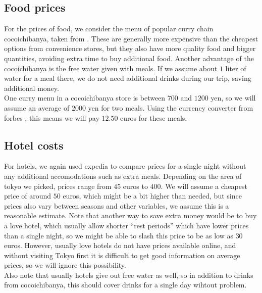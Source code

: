 \documentclass{article}
\begin{document}
\subsection{Food prices}
For the prices of food, we consider the menu of popular curry chain cocoichibanya, taken from \cite{coco}.
These are generally more expensive than the cheapest options from convenience stores, but they also have more quality food and bigger quantities, avoiding extra time to buy additional food.
Another advantage of the cocoichibanya is the free water given with meals. 
If we assume about $1$ liter of water for a meal there, we do not need additional drinks during our trip, saving additional money.\\
One curry menu in a cocoichibanya store is between $700$ and $1200$ yen, so we will assume an average of $2000$ yen for two meals.
Using the currency converter from forbes \cite{yen}, this means we will pay $12.50$ euros for these meals. 

\subsection{Hotel costs}
For hotels, we again used expedia \cite{exp} to compare prices for a single night without any additional accomodations such as extra meals.
Depending on the area of tokyo we picked, prices range from $45$ euros to $400$.
We will assume a cheapest price of around $50$ euros, which might be a bit higher than needed, but since prices also vary between seasons and other variables, we assume this is a reasonable estimate.
Note that another way to save extra money would be to buy a love hotel, which usually allow shorter ``rest periods'' which have lower prices than a single night, so we might be able to slash this price to be as low as $30$ euros.
However, usually love hotels do not have prices available online, and without visiting Tokyo first it is difficult to get good information on average prices, so we will ignore this possibility.\\
Also note that usually hotels give out free water as well, so in addition to drinks from cocoichibanya, this should cover drinks for a single day wihtout problem.
\end{document}
